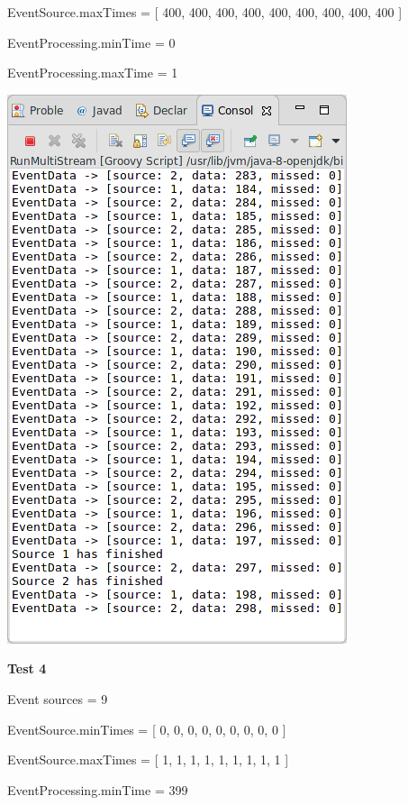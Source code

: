 EventSource.maxTimes = [ 400, 400, 400, 400, 400, 400, 400, 400, 400 ]

EventProcessing.minTime = 0

EventProcessing.maxTime = 1

\includegraphics[width=\textwidth/2]{img/screenshots/9-2-3.png}

\textbf{Test 4}

Event sources = 9

EventSource.minTimes = [ 0, 0, 0, 0, 0, 0, 0, 0, 0 ]

EventSource.maxTimes = [ 1, 1, 1, 1, 1, 1, 1, 1, 1 ]

EventProcessing.minTime = 399

